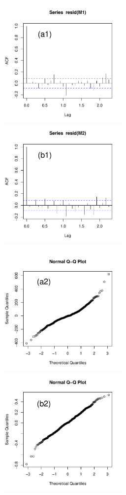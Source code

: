 \documentclass[11pt]{article}
\begin{document}


\begin{figure}[h]\vspace{-0.5cm}
\includegraphics[width=3in,height=2.5in]{m1-resid}
\hfill\includegraphics[width=3in,height=2.5in]{m2-resid}

\includegraphics[width=3in,height=2.5in]{m1-qq}
\hfill\includegraphics[width=3in,height=2.5in]{m2-qq}


\end{figure}
\end{document}
